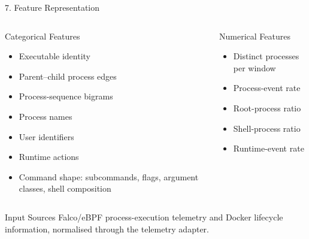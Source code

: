 \documentclass[aspectratio=169,10pt]{beamer}
\begin{document}
\begin{frame}{7. Feature Representation}
\small

\begin{columns}[T,onlytextwidth]
\begin{block}{Categorical Features}
\begin{itemize}
  \item Executable identity
  \item Parent--child process edges
  \item Process-sequence bigrams
  \item Process names
  \item User identifiers
  \item Runtime actions
  \item Command shape: subcommands, flags, argument classes, shell composition
\end{itemize}
\end{block}

\begin{block}{Numerical Features}
\begin{itemize}
  \item Distinct processes per window
  \item Process-event rate
  \item Root-process ratio
  \item Shell-process ratio
  \item Runtime-event rate
\end{itemize}
\end{block}

\end{columns}

\vspace{0.15cm}

\begin{block}{Input Sources}
Falco/eBPF process-execution telemetry and Docker lifecycle information, normalised through the telemetry adapter.
\end{block}
\end{frame}
\end{document}
